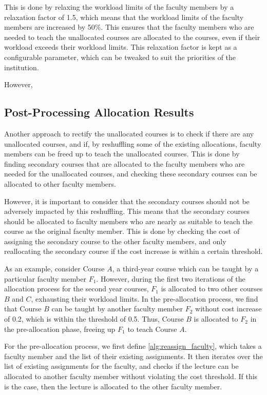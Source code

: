 This is done by relaxing the workload limits of the faculty members by a relaxation factor of 1.5, which means that the workload limits of the faculty members are increased by 50\%. This ensures that the faculty members who are needed to teach the unallocated courses are allocated to the courses, even if their workload exceeds their workload limits. This relaxation factor is kept as a configurable parameter, which can be tweaked to suit the priorities of the institution.

However,

\subsection{Post-Processing Allocation Results}
\label{sec:post_allocation}

Another approach to rectify the unallocated courses is to check if there are any unallocated courses, and if, by reshuffling some of the existing allocations, faculty members can be freed up to teach the unallocated courses. This is done by finding secondary courses that are allocated to the faculty members who are needed for the unallocated courses, and checking these secondary courses can be allocated to other faculty members.

However, it is important to consider that the secondary courses should not be adversely impacted by this reshuffling. This means that the secondary courses should be allocated to faculty members who are nearly as suitable to teach the course as the original faculty member. This is done by checking the cost of assigning the secondary course to the other faculty members, and only reallocating the secondary course if the cost increase is within a certain threshold.

As an example, consider Course $A$, a third-year course which can be taught by a particular faculty member $F_1$. However, during the first two iterations of the allocation process for the second year courses, $F_1$ is allocated to two other courses $B$ and $C$, exhausting their workload limits. In the pre-allocation process, we find that Course $B$ can be taught by another faculty member $F_2$ without cost increase of 0.2, which is within the threshold of 0.5. Thus, Course $B$ is allocated to $F_2$ in the pre-allocation phase, freeing up $F_1$ to teach Course $A$.

For the pre-allocation process, we first define \autoref{alg:reassign_faculty}, which takes a faculty member and the list of their existing assignments. It then iterates over the list of existing assignments for the faculty, and checks if the lecture can be allocated to another faculty member without violating the cost threshold. If this is the case, then the lecture is allocated to the other faculty member.

